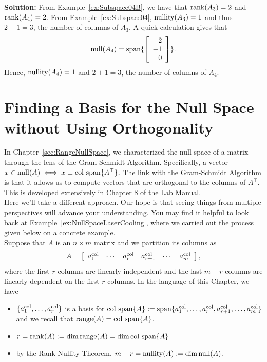\textbf{Solution:} From Example~\ref{ex:Subspace04B}, we have that $\mathrm{rank}(A_3)=2$ and $\mathrm{rank}(A_4)=2$. From Example~\ref{ex:Subspace04}, $\mathrm{nullity}(A_3)=1$ and thus $2 + 1 =3$, the number of columns of $A_3$. A quick calculation gives that 
$$\mathrm{null}(A_4) =\mathrm{span} \{ \left[\begin{array}{r}  2 \\ -1 \\ 0\end{array} \right]  \}. $$ Hence, $\mathrm{nullity}(A_4)=1$ and $2 + 1 =3$, the number of columns of $A_4$.

\Qed
  

\vspace*{.5cm}

\section{Finding a Basis for the Null Space without Using Orthogonality}

In Chapter~\ref{sec:RangeNullSpace}, we characterized the null space of a matrix through the lens of the Gram-Schmidt Algorithm. Specifically, a vector $x \in \mathrm{null}(A) \iff x \perp \mathrm{col~span} \{ A^\top \}.$ The link with the Gram-Schmidt Algorithm is that it allows us to compute vectors that are orthogonal to the columns of $A^\top$. This is developed extensively in Chapter 8 of the Lab Manual.\\

Here we'll take a different approach. Our hope is that seeing things from multiple perspectives will advance your understanding. You may find it helpful to look back at Example~\ref{ex:NullSpaceLaserCooling}, where we carried out the process given below on a concrete example.\\

Suppose that $A$ is an $n \times m$ matrix and we partition its columns as
\begin{equation}
    A = \left[ \begin{array}{cccccc} a_1^{\rm col} & \cdots & a_r^{\rm col} & a_{r+1}^{\rm col}& \cdots & a_m^{\rm col} \end{array} \right],
\end{equation}
where the first $r$ columns are linearly independent and the last $m-r$ columns are linearly dependent on the first $r$ columns. In the language of this Chapter, we have
\begin{itemize}
    \item $\{ a_1^{\rm col}, \ldots,  a_r^{\rm col}  \}$ is a basis for $\mathrm{col~span} \{ A \}:=\mathrm{span} \{ a_1^{\rm col}, \ldots, a_r^{\rm col}, a_{r+1}^{\rm col}, \ldots, a_m^{\rm col} \}$ and we recall that $\mathrm{range}(A) = \mathrm{col~span} \{ A \}$.
    \item $r=\mathrm{rank}(A):= \dim \mathrm{range}(A)=\dim \mathrm{col~span} \{ A \}$
    \item by the Rank-Nullity Theorem, $m-r = \mathrm{nullity}(A):=\dim \mathrm{null}(A)$.
\end{itemize}
\vspace*{.1cm}

